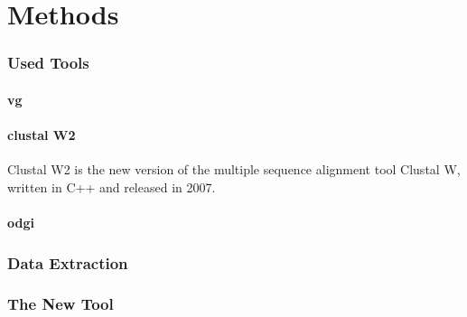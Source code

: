 \chapter{Methods}
\label{sec:methods}

\subsection{Used Tools}
\subsubsection{vg}
\subsubsection{clustal W2}
Clustal W2 is the new version of the multiple sequence alignment tool Clustal W, written in C++ and released in 2007.

\subsubsection{odgi}

\subsection{Data Extraction}

\subsection{The New Tool}

